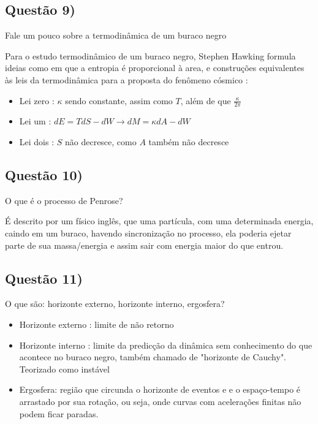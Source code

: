 \documentclass{article}
\begin{document}
\subsection*{Questão 9)}
\begin{boxx}
Fale um pouco sobre a termodinâmica de um buraco negro
\end{boxx}
Para o estudo termodinâmico de um buraco negro, Stephen Hawking formula ideias como em que a entropia é proporcional à area, e construções equivalentes às leis da termodinâmica para a proposta do fenômeno cósmico : 
\begin{itemize}
    \item Lei zero : $\kappa$ sendo constante, assim como $T$, além de que $\frac{\kappa}{2\pi}$
    
    \item Lei um : $dE = TdS-dW \longrightarrow dM = \kappa d A - dW$ 
    
    \item Lei dois : $S$ não decresce, como $A$ também não decresce
\end{itemize}
 
\subsection*{Questão 10)}
\begin{boxx}
O que é o processo de Penrose?
\end{boxx}
 É descrito por um físico inglês, que uma partícula, com uma determinada energia, caindo em um buraco, havendo sincronização no processo, ela poderia ejetar parte de sua massa/energia e assim sair com energia maior do que entrou.
 
\subsection*{Questão 11)}
\begin{boxx}
O que são: horizonte externo, horizonte interno, ergosfera?
\end{boxx}

\begin{itemize}
    \item Horizonte externo : limite de não retorno
    
    \item Horizonte interno : limite da predicção da dinâmica sem conhecimento do que acontece no buraco negro, também chamado de "horizonte de Cauchy". Teorizado como instável
    
    \item Ergosfera: região que circunda o horizonte de eventos e e o espaço-tempo é arrastado por sua rotação, ou seja, onde curvas com acelerações finitas não podem ficar paradas.
\end{itemize}
\end{document}
